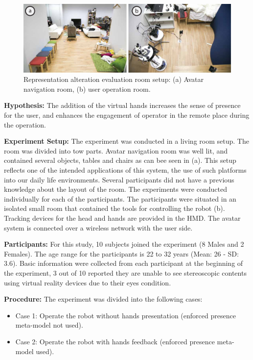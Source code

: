 \begin{figure}[b]
  \centering
	  \includegraphics[width=1\linewidth]{figures/eval/ET/EnvironmentSetup.pdf}
  \captionsetup{justification=centering}
  \caption{Representation alteration evaluation room setup: (a) Avatar navigation room, (b) user operation room.}
  \label{fig:eval-setup}
\end{figure}

\textbf{Hypothesis:} The addition of the virtual hands increases the sense of presence for the user, and enhances the engagement of operator in the remote place during the operation. 


\textbf{Experiment Setup:} The experiment was conducted in a living room setup. The room was divided into tow parts. Avatar navigation room was well lit, and contained several objects, tables and chairs as can bee seen in
(a). This setup reflects one of the intended applications of this system, the use of such platforms into our daily life environments. Several participants did not have a previous knowledge about the layout of the room. The experiments were conducted individually for each of the participants. The participants were situated in an isolated small room that contained the tools for controlling the robot (b). Tracking devices for the head and hands are provided in the HMD. The avatar system is connected over a wireless network with the user side.

\textbf{Participants:} For this study, 10 subjects joined the experiment (8 Males and 2 Females). The age range for the participants is 22 to 32 years (Mean: 26 - SD: 3.6). Basic information were collected from each participant at the beginning of the experiment, 3 out of 10 reported they are unable to see stereoscopic contents using virtual reality devices due to their eyes condition.

\textbf{Procedure:} The experiment was divided into the following cases:
\begin{itemize}
  \item Case 1: Operate the robot without hands presentation (enforced presence meta-model not used).
  \item Case 2: Operate the robot with hands feedback (enforced presence meta-model used).
\end{itemize}



